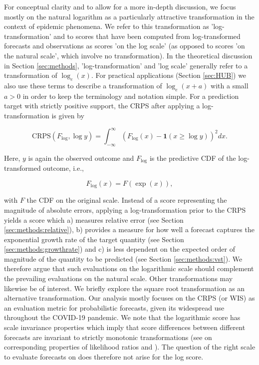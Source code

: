 \documentclass[10pt,letterpaper]{article}
\begin{document}
For conceptual clarity and to allow for a more in-depth discussion, we focus mostly on the natural logarithm as a particularly attractive transformation in the context of epidemic phenomena. We refer to this transformation as 'log-transformation' and to scores that have been computed from log-transformed forecasts and observations as scores 'on the log scale' (as opposed to scores 'on the natural scale', which involve no transformation). In the theoretical discussion in Section \ref{sec:methods}, 'log-transformation' and 'log scale' generally refer to a transformation of $\log_{e}(x)$. For practical applications (Section \ref{sec:HUB}) we also use these terms to describe a transformation of $\log_{e}(x + a)$ with a small $a > 0$ in order to keep the terminology and notation simple. For a prediction target with strictly positive support, the CRPS after applying a log-transformation is given by
%
\begin{linenomath*}
\begin{equation}
    \text{CRPS}(F_{\log}, \log y) = \int_{-\infty}^\infty \left( F_{\log}(x) - \boldsymbol{1}(x \geq \log y) \right)^2 dx.
\end{equation}    
\end{linenomath*}
%
Here, $y$ is again the observed outcome and $F_{\log}$ is the predictive CDF of the log-transformed outcome, i.e.,
\begin{linenomath*}
\begin{equation}
F_{\log}(x) = F(\exp(x)),
\end{equation}    
\end{linenomath*}
with $F$ the CDF on the original scale. Instead of a score representing the magnitude of absolute errors, applying a log-transformation prior to the CRPS yields a score which a) measures relative error (see Section \ref{sec:methods:relative}), b) provides a measure for how well a forecast captures the exponential growth rate of the target quantity (see Section \ref{sec:methods:growthrate}) and c) is less dependent on the expected order of magnitude of the quantity to be predicted (see Section \ref{sec:methods:vst}). 
We therefore argue that such evaluations on the logarithmic scale should complement the prevailing evaluations on the natural scale. 
Other transformations may likewise be of interest. We briefly explore the square root transformation as an alternative transformation. 
Our analysis mostly focuses on the CRPS (or WIS) as an evaluation metric for probabilistic forecasts, given its widespread use throughout the COVID-19 pandemic. We note that the logarithmic score has scale invariance properties which imply that score differences between different forecasts are invariant to strictly monotonic transformations (see \cite{Lehmann1950} on corresponding properties of likelihood ratios and \cite{diksLikelihoodbasedScoringRules2011}). The question of the right scale to evaluate forecasts on does therefore not arise for the log score. 
\end{document}
